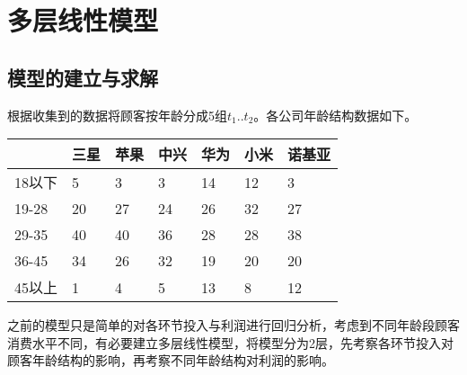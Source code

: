 \documentclass{article}
\begin{document}
\fi
\clearpage
\section{多层线性模型}
\subsection{模型的建立与求解}
根据收集到的数据将顾客按年龄分成5组\(t_1..t_2\)。各公司年龄结构数据如下。
\begin{table}[htbp]
	\caption{各公司顾客年龄结构}
	\begin{longtabu}to
		\toprule
		&三星      & 苹果        & 中兴       & 华为         & 小米        & 诺基亚\\\midrule
		18以下  & 5  & 3  & 3  & 14 & 12  & 3  \\
		19-28 & 20 & 27 & 24 & 26 & 32  & 27 \\
		29-35 & 40 & 40 & 36 & 28 & 28  & 38 \\
		36-45 & 34 & 26 & 32 & 19 & 20  & 20 \\
		45以上  & 1  & 4  & 5  & 13 & 8   & 12 \\ \bottomrule
	\end{longtabu}
\end{table}
\par\indent 之前的模型只是简单的对各环节投入与利润进行回归分析，考虑到不同年龄段顾客消费水平不同，有必要建立多层线性模型，将模型分为2层，先考察各环节投入对顾客年龄结构的影响，再考察不同年龄结构对利润的影响。
\end{document}
